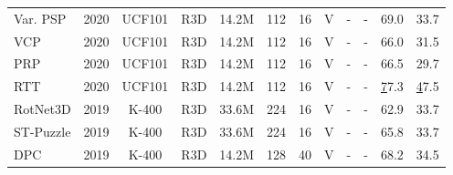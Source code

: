 \documentclass[10pt,twocolumn,letterpaper]{article}
\begin{document}
\begin{table*}
\begin{center}
{\begin{tabular}{lccccccccccc}
Var. PSP \cite{cho_self-supervised_2020}       & 2020                  & UCF101                          & R3D                          & 14.2M                        & 112                        & 16                        & V                       &	-	 &    -      & 69.0                        & 33.7                        \\
VCP  \cite{luo_video_2020}              & 2020        & UCF101                          & R3D                          & 14.2M                        & 112                        & 16                        & V                        &	-	 &    -     & 66.0                        & 31.5                        \\
PRP \cite{yao_video_2020}                    & 2020        & UCF101                          & R3D                          & 14.2M                        & 112                        & 16                        & V                      &	-	 &    -       & 66.5                        & 29.7                        \\
RTT \cite{jenni_video_2020}          & 2020                  & UCF101                          & R3D                          & 14.2M                        & 112                        & 16                        & V                      &	-	 &    -       & {\ul 77.3}                        & {\ul 47.5}                        \\
{\color[HTML]{9B9B9B} RotNet3D \cite{jing_self-supervised_2019}}  & {\color[HTML]{9B9B9B} 2019}   & {\color[HTML]{9B9B9B} K-400} & {\color[HTML]{9B9B9B} R3D}   & {\color[HTML]{9B9B9B} 33.6M} & {\color[HTML]{9B9B9B} 224} & {\color[HTML]{9B9B9B} 16} & {\color[HTML]{9B9B9B} V} & {\color[HTML]{9B9B9B} -} & {\color[HTML]{9B9B9B} -}  & {\color[HTML]{9B9B9B} 62.9} & {\color[HTML]{9B9B9B} 33.7} \\
{\color[HTML]{9B9B9B} ST-Puzzle \cite{kim_self-supervised_2019}} & {\color[HTML]{9B9B9B} 2019}    & {\color[HTML]{9B9B9B} K-400} & {\color[HTML]{9B9B9B} R3D}   & {\color[HTML]{9B9B9B} 33.6M} & {\color[HTML]{9B9B9B} 224} & {\color[HTML]{9B9B9B} 16} & {\color[HTML]{9B9B9B} V} & {\color[HTML]{9B9B9B} -} & {\color[HTML]{9B9B9B} -}  & {\color[HTML]{9B9B9B} 65.8} & {\color[HTML]{9B9B9B} 33.7} \\
{\color[HTML]{9B9B9B} DPC \cite{han_video_2019} }     & {\color[HTML]{9B9B9B} 2019}       & {\color[HTML]{9B9B9B} K-400} & {\color[HTML]{9B9B9B} R3D}   & {\color[HTML]{9B9B9B} 14.2M} & {\color[HTML]{9B9B9B} 128} & {\color[HTML]{9B9B9B} 40} & {\color[HTML]{9B9B9B} V} & {\color[HTML]{9B9B9B} -} & {\color[HTML]{9B9B9B} -}  & {\color[HTML]{9B9B9B} 68.2} & {\color[HTML]{9B9B9B} 34.5} \\

\end{tabular}}
\end{center}
\end{table*}
\end{document}
